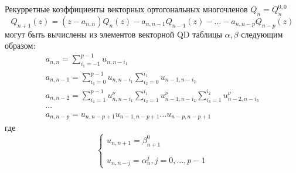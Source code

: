 {\begin{teor}
Рекурретные коэффициенты векторных ортогональных многочленов $Q_n
= Q_n^{0,0}$
$$%
Q_{n+1}(z)=(z-a_{n,n})Q_n(z)-a_{n,n-1}Q_{n-1}(z)-\ldots-a_{n,n-p}Q_{n-p}(z)
$$%
могут быть вычислены из элементов векторной QD
таблицы $\alpha, \beta$ следующим образом:
%
\begin{eqnarray}
a_{n,n}=\sum\limits_{i_1=-1}^{p-1}{u_{n,n-i_1}} \nonumber\\
a_{n,n-1}=\sum\limits_{i_1=0}^{p-1}{u_{n,n-i_1}}
\sum\limits_{i_2=0}^{i_1}{u_{n-1,n-i_2}} \nonumber\\
a_{n,n-2}=\sum\limits_{i_1=1}^{p-1}{u_{n,n-i_1}^{\nu }}
\sum\limits_{i_2=1}^{i_1}{u_{n-1,n-i_2}^{\nu }}
\sum\limits_{i_3=1}^{i_2}{u_{n-2,n-i_3}^{\nu }} \nonumber \\
\cdots \nonumber\\
a_{n,n-p}={u_{n,n-p+1}}{u_{n-1,n-p+1}}\ldots {u_{n-p,n-p+1}}
\nonumber
\end{eqnarray}
%
где
\begin{equation}
\left\{
\begin{array}{llllllll}
u_{n,n+1} = \beta_{n+1}^{0} \\ \\
u_{n,n-j} = \alpha_{n}^{j}, j=0,\ldots,p-1
\end{array}
\right.
\end{equation}
\end{teor}

}
